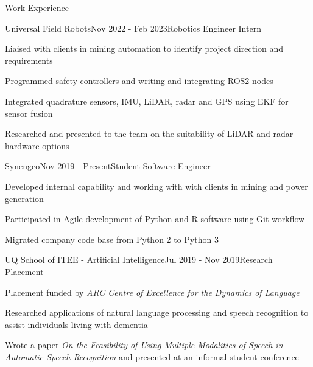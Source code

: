 \documentclass{resume} %
\begin{document}
\vspace{1em}
\begin{rSection}{Work Experience}

\begin{rSubsection}{Universal Field Robots}{Nov 2022 - Feb 2023}{Robotics Engineer Intern}{}
\item Liaised with clients in mining automation to identify project direction and requirements
\item Programmed safety controllers and writing and integrating ROS2 nodes
\item Integrated quadrature sensors, IMU, LiDAR, radar and GPS using EKF for sensor fusion
\item Researched and presented to the team on the suitability of LiDAR and radar hardware options
\end{rSubsection}


\begin{rSubsection}{Synengco}{Nov 2019 - Present}{Student Software Engineer}{}
\item Developed internal capability and working with with clients in mining and power generation
\item Participated in Agile development of Python and R software using Git workflow
\item Migrated company code base from Python 2 to Python 3
\end{rSubsection}


\begin{rSubsection}{UQ School of ITEE - Artificial Intelligence}{Jul 2019 - Nov 2019}{Research Placement}{}
\item Placement funded by \textit{ARC Centre of Excellence for the Dynamics of Language}
\item Researched applications of natural language processing and speech recognition to assist individuals living with dementia
\item Wrote a paper \textit{On the Feasibility of Using Multiple Modalities of Speech in Automatic Speech Recognition} and presented at an informal student conference
\end{rSubsection}

\end{rSection}
\end{document}
